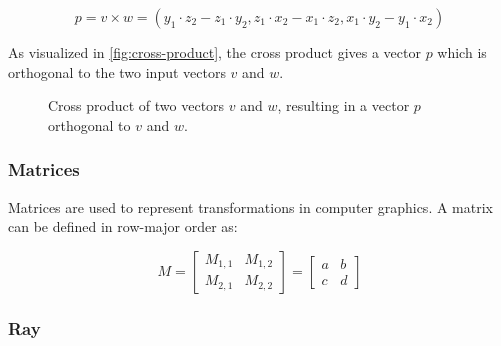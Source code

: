 \begin{equation}
  \label{eqn:cross-product}
  p = v \times w = (y_1 \cdot z_2 - z_1 \cdot y_2, z_1 \cdot x_2 - x_1 \cdot z_2, x_1 \cdot y_2 - y_1 \cdot x_2)
\end{equation}

As visualized in \autoref{fig:cross-product}, the cross product gives a vector $p$ which is orthogonal to the two input vectors $v$ and $w$.

\begin{figure}[H]
  \centering
  \caption{Cross product of two vectors $v$ and $w$, resulting in a vector $p$ orthogonal to $v$ and $w$.}
  \label{fig:cross-product}
\end{figure}

\subsubsection{Matrices}

Matrices are used to represent transformations in computer graphics. A matrix can be defined in row-major order as:

\begin{equation}
  \label{eqn:matrix}
  M = \begin{bmatrix} M_{1,1} & M_{1,2} \\ M_{2,1} & M_{2,2} \end{bmatrix} = \begin{bmatrix} a & b \\ c & d \end{bmatrix}
\end{equation}

\subsubsection{Ray}

